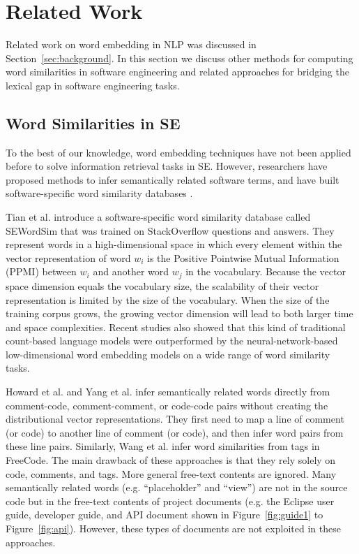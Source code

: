 \section{Related Work}
\label{sec:related word}

Related work on word embedding in NLP was discussed in Section~\ref{sec:background}. In this section we discuss other methods for computing word similarities in software engineering and related approaches for bridging the lexical gap in software engineering tasks.

\subsection{Word Similarities in SE}

To the best of our knowledge, word embedding techniques have not been applied before to solve information retrieval tasks in SE. However, researchers \cite{Howard:2013:AMS:2487085.2487155, Wang:2012:ISR:2473496.2473617, 6224276} have proposed methods to infer semantically related software terms, and have built software-specific word similarity databases \cite{6747213, Tian:2014:SSW:2591062.2591071}.

Tian et al. \cite{6747213, Tian:2014:SSW:2591062.2591071} introduce a software-specific word similarity database called SEWordSim that was trained on StackOverflow questions and answers. They represent words in a high-dimensional space in which every element within the vector representation of word $w_i$ is the Positive Pointwise Mutual Information (PPMI) between $w_i$ and another word $w_j$ in the vocabulary. Because the vector space dimension equals the vocabulary size, the scalability of their vector representation is limited by the size of the vocabulary. When the size of the training corpus grows, the growing vector dimension will lead to both larger time and space complexities. Recent studies \cite{baroni-etal-2014b, Mikolov:ICLR} also showed that this kind of traditional count-based language models were outperformed by the neural-network-based low-dimensional word embedding models on a wide range of word similarity tasks.

Howard et al. \cite{Howard:2013:AMS:2487085.2487155} and Yang et al. \cite{6224276} infer semantically related words directly from comment-code, comment-comment, or code-code pairs without creating the distributional vector representations. They first need to map a line of comment (or code) to another line of comment (or code), and then infer word pairs from these line pairs. Similarly, Wang et al. \cite{Wang:2012:ISR:2473496.2473617} infer word similarities from tags in FreeCode. The main drawback of these approaches is that they rely solely on code, comments, and tags. More general free-text contents are ignored. Many semantically related words (e.g. ``placeholder'' and ``view'') are not in the source code but in the free-text contents of project documents (e.g. the Eclipse user guide, developer guide, and API document shown in Figure~\ref{fig:guide1} to Figure~\ref{fig:api}). However, these types of documents are not exploited in these approaches.

